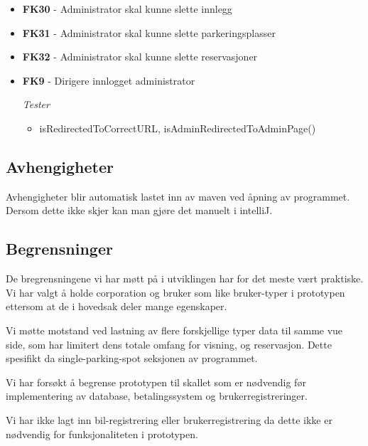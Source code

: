 \documentclass[12pt]{article}
\begin{document}
\begin{itemize}
        \item \textbf{FK30} - Administrator skal kunne slette innlegg
        
        \item \textbf{FK31} - Administrator skal kunne slette parkeringsplasser
        
        \item \textbf{FK32} - Administrator skal kunne slette reservasjoner
        
        \item \textbf{FK9} - Dirigere innlogget administrator
        
            \textit{Tester}
            \begin{itemize}
                \item isRedirectedToCorrectURL, isAdminRedirectedToAdminPage()
            \end{itemize}
    \end{itemize}




    \subsection{Avhengigheter}
    Avhengigheter blir automatisk lastet inn av maven ved åpning av programmet. Dersom dette ikke skjer kan man gjøre det manuelt i intelliJ.

    \subsection{Begrensninger}
    De bregrensningene vi har møtt på i utviklingen har for det meste vært praktiske. Vi har valgt å holde corporation og bruker som like bruker-typer i prototypen ettersom at de i hovedsak deler mange egenskaper.
    
    Vi møtte motstand ved lastning av flere forskjellige typer data til samme vue side, som har limitert dens totale omfang for visning, og reservasjon. Dette spesifikt da single-parking-spot seksjonen av programmet.
    
    Vi har forsøkt å begrense prototypen til skallet som er nødvendig før implementering av database, betalingssystem og brukerregistreringer.
    
    Vi har ikke lagt inn bil-registrering eller brukerregistrering da dette ikke er nødvendig for funksjonaliteten i prototypen. 
    
\end{document}
